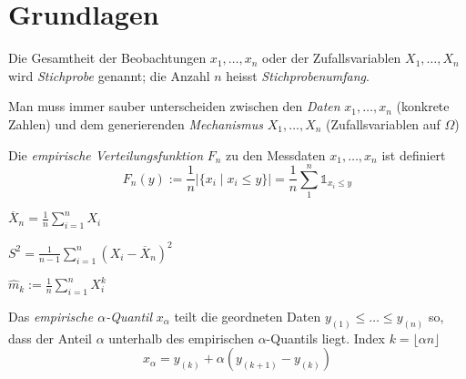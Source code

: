 


\section{Grundlagen}

\begin{definition}[Stichprobe]
	Die Gesamtheit der Beobachtungen \(x_1, \ldots, x_n\) oder der Zufallsvariablen \(X_1, \ldots, X_n\)
	wird \emph{Stichprobe} genannt; die Anzahl \(n\) heisst \emph{Stichprobenumfang}.
\end{definition}

\begin{note}
	Man muss immer sauber unterscheiden zwischen den \emph{Daten} \(x_1, \ldots, x_n\)  (konkrete Zahlen)
	und dem generierenden \emph{Mechanismus} \(X_1, \ldots, X_n\) (Zufallsvariablen auf \(\Omega\))
\end{note}

\begin{definition}
	Die \emph{empirische Verteilungsfunktion} \(F_n\) zu den Messdaten \(x_1,\ldots,x_n\) ist definiert
	\[
	\textstyle
	F_n(y) := \frac{1}{n} \lvert\{x_i\mid x_i \leq y\}\rvert
	= \frac{1}{n} \sum_1^n \mathbb{1}_{x_i \leq y}
	\]
\end{definition}

\begin{definition}
	\( \overline{X}_n = \frac{1}{n} \sum_{i=1}^n X_i \)
\end{definition}

\begin{definition}
	\( S^2 = \frac{1}{n-1} \sum_{i=1}^n (X_i-\overline{X}_n)^2 \)
\end{definition}

\begin{definition}
	\( \hat{m}_k := \frac{1}{n} \sum_{i=1}^n X_i^k \)
\end{definition}

\begin{definition} Das \emph{empirische \(\alpha\)-Quantil} \(x_\alpha\)
	teilt die geordneten Daten \(y_{(1)} \leq \ldots \leq y_{(n)}\) so, dass
	der Anteil \(\alpha\) unterhalb des empirischen \(\alpha\)-Quantils liegt.
	Index \(k = \lfloor \alpha n \rfloor\)
	\[
	x_\alpha= y_{(k)} + \alpha \left(y_{(k+1)} - y_{(k)} \right)
	\]
\end{definition}


